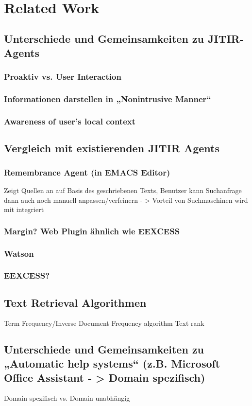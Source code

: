 \section{Related Work}
\subsection{Unterschiede und Gemeinsamkeiten zu JITIR-Agents}
 \subsubsection{Proaktiv vs. User Interaction}
 \subsubsection{Informationen darstellen in „Nonintrusive Manner“}
 \subsubsection{Awareness of user's local context}
\subsection{Vergleich mit existierenden JITIR Agents}
 	\subsubsection{Remembrance Agent (in EMACS Editor)}
		Zeigt Quellen an auf Basis des geschriebenen Texts, Benutzer kann Suchanfrage dann auch noch manuell anpassen/verfeinern
		- > Vorteil von Suchmaschinen wird mit integriert
 	\subsubsection{Margin? Web Plugin ähnlich wie EEXCESS}
 	\subsubsection{Watson}
 	\subsubsection{EEXCESS?}
 	\subsection{Text Retrieval Algorithmen}
 		Term Frequency/Inverse Document Frequency algorithm
 		Text rank
 \subsection{Unterschiede und Gemeinsamkeiten zu „Automatic help systems“ (z.B. Microsoft Office Assistant - > Domain spezifisch)}
 	Domain spezifisch vs. Domain unabhängig

